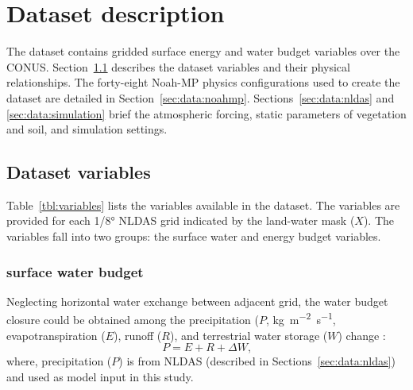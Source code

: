 \documentclass[essd]{copernicus}
\begin{document}
\section{Dataset description}\label{sec:data}

The dataset contains gridded surface energy and water budget variables over the
CONUS. Section~\ref{sec:data:variables} describes the dataset variables and
their physical relationships. The forty-eight Noah-MP physics configurations
used to create the dataset are detailed in Section~\ref{sec:data:noahmp}.
Sections~\ref{sec:data:nldas} and \ref{sec:data:simulation} brief the
atmospheric forcing, static parameters of vegetation and soil, and simulation
settings.


\subsection{Dataset variables}\label{sec:data:variables}

Table~\ref{tbl:variables} lists the variables available in the dataset. The
variables are provided for each 1/8° NLDAS grid indicated by the
land-water mask (\(X\)). The variables fall into two groups: the surface water
and energy budget variables.



\subsubsection{surface water budget}

Neglecting horizontal water exchange between adjacent grid, the water budget
closure could be obtained among the precipitation (\(P\),
\si{kg~m^{-2}~s^{-1}}, evapotranspiration (\(E\)), runoff (\(R\)), and
terrestrial water storage (\(W\)) change \citep{zheng2020JAMES}:
\begin{equation}
  P = E + R + \Delta W \text{,}
\end{equation}
where, precipitation (\(P\)) is from NLDAS (described in
Sections~\ref{sec:data:nldas}) and used as model input in this study.
\end{document}
